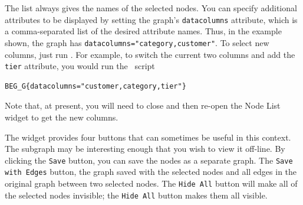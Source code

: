 The list always gives the names of the selected nodes. You can specify additional attributes to be
displayed by setting the graph's {\tt datacolumns} attribute, which is a comma-separated list of the
desired attribute names. Thus, in the example shown, the graph has {\tt datacolumns="category,customer"}.
To select new columns, just run \gvpr. For example, to switch the current two columns and add the
{\tt tier} attribute, you would run the \gvpr\ script
\begin{verbatim}
BEG_G{datacolumns="customer,category,tier"}
\end{verbatim}
Note that, at present, you will need to close and then re-open the Node List widget to get the new columns.

The widget provides four buttons that can sometimes be useful in this context. The subgraph may be
interesting enough that you wish to view it off-line. By clicking the {\tt Save} button, you can save
the nodes as a separate graph. The {\tt Save with Edges} button, the graph saved with the selected nodes
and all edges in the original graph between two selected nodes. The {\tt Hide All} button will make all of 
the selected nodes invisible; the {\tt Hide All} button makes them all visible.
